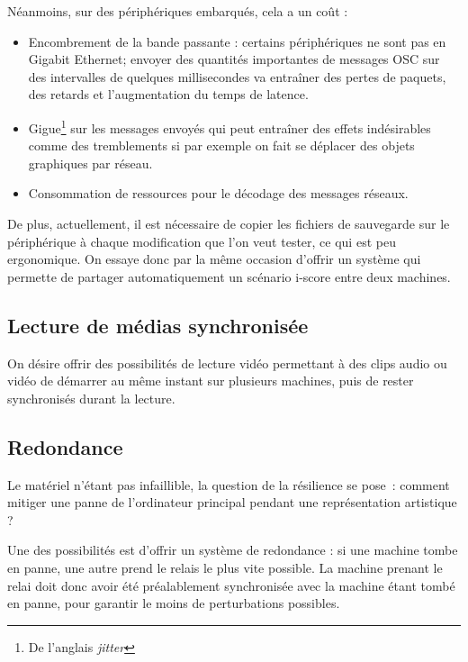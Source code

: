 \documentclass{article}
\newcommand\trigger{point d'interaction\xspace}
\begin{document}
Néanmoins, sur des périphériques embarqués, cela a un coût : 
\begin{itemize}
    \item Encombrement de la bande passante : certains périphériques ne sont pas en Gigabit Ethernet; envoyer des quantités importantes de messages OSC sur des intervalles de quelques millisecondes va entraîner des pertes de paquets, des retards et l'augmentation du temps de latence.
    \item Gigue\footnote{De l'anglais \textit{jitter}} sur les messages envoyés qui peut entraîner des effets indésirables comme des tremblements si par exemple on fait se déplacer des objets graphiques par réseau.
    \item Consommation de ressources pour le décodage des messages réseaux.
\end{itemize}

De plus, actuellement, il est nécessaire de copier les fichiers de sauvegarde sur le périphérique à chaque modification que l'on veut tester, ce qui est peu ergonomique. 
On essaye donc par la même occasion d'offrir un système qui permette de partager automatiquement un scénario i-score entre deux machines.

\subsection{Lecture de médias synchronisée}
On désire offrir des possibilités de lecture vidéo permettant à 
des clips audio ou vidéo de démarrer au même instant sur plusieurs machines, 
puis de rester synchronisés durant la lecture.

\subsection{Redondance}
Le matériel n'étant pas infaillible, la question de la résilience se pose~: comment mitiger une panne de l'ordinateur principal pendant une représentation artistique ?

Une des possibilités est d'offrir un système de redondance : si une machine tombe en panne, une autre prend le relais le plus vite possible.
La machine prenant le relai doit donc avoir été préalablement synchronisée avec la machine étant tombé en panne, pour garantir le moins de perturbations possibles.
 
\end{document}
